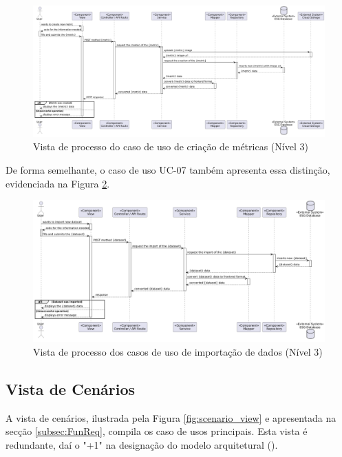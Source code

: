\begin{figure}[H]
\centering
\includegraphics[width=\linewidth]{frontmatter/assets/diagrams/Process Views/LVL3/uc-06-lvl3.png}
\caption{Vista de processo do caso de uso de criação de métricas (Nível 3)}
\label{fig:UC6-lvl3}
\end{figure}

De forma semelhante, o caso de uso UC-07 também apresenta essa distinção, evidenciada na Figura \ref{fig:UC7-lvl3}.

\begin{figure}[H]
\centering
\includegraphics[width=\linewidth]{frontmatter/assets/diagrams/Process Views/LVL3/uc-07-lvl3.png}
\caption{Vista de processo dos casos de uso de importação de dados (Nível 3)}
\label{fig:UC7-lvl3}
\end{figure}


\subsection{Vista de Cenários}

A vista de cenários, ilustrada pela Figura \ref{fig:scenario_view} e apresentada na secção \ref{subsec:FunReq}, compila os caso de usos principais. Esta vista é redundante, daí o "+1" na designação do modelo arquitetural (\cite{Kruchten1995}).

